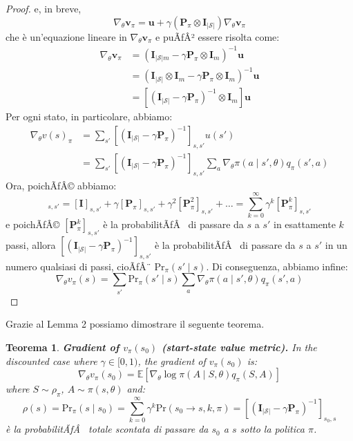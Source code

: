 ﻿\documentclass[11pt, a4paper]{report}
\newtheorem{theorem}{Teorema}
\begin{document}
\begin{proof}
e, in breve,
\begin{equation}
\nabla_{\theta} \bm{v}_{\pi} = \bm{u} + \gamma (\bm{P}_{\pi} \otimes \bm{I}_{|\mathcal{S}|}) \nabla_{\theta} \bm{v}_{\pi}
\end{equation}
che è un'equazione lineare in $\nabla_{\theta} \bm{v}_{\pi}$ e puÃƒÂ² essere risolta come:
\begin{align*}
\nabla_{\theta} \bm{v}_{\pi} &= (\bm{I}_{|\mathcal{S}|m} - \gamma \bm{P}_{\pi} \otimes \bm{I}_m)^{-1} \bm{u} \\
&= (\bm{I}_{|\mathcal{S}|} \otimes \bm{I}_m - \gamma \bm{P}_{\pi} \otimes \bm{I}_m)^{-1} \bm{u} \\
&= [(\bm{I}_{|\mathcal{S}|} - \gamma \bm{P}_{\pi})^{-1} \otimes \bm{I}_m] \bm{u}
\end{align*}
Per ogni stato, in particolare, abbiamo:
\begin{align*}
\nabla_{\theta} v(s)_{\pi} &= \sum_{s'} [(\bm{I}_{|\mathcal{S}|} - \gamma \bm{P}_{\pi})^{-1}]_{s, s'} u(s') \\
&= \sum_{s'} [(\bm{I}_{|\mathcal{S}|} - \gamma \bm{P}_{\pi})^{-1}]_{s, s'} \sum_a \nabla_{\theta} \pi(a \mid s', \theta) q_{\pi}(s', a)
\end{align*}
Ora, poichÃƒÂ© abbiamo:
\begin{equation}
[(\bm{I}_{|\mathcal{S}|} - \gamma \bm{P}_{\pi})^{-1}]_{s, s'} = [\bm{I}]_{s, s'} + \gamma [\bm{P}_{\pi}]_{s, s'} + \gamma^2 [\bm{P}_{\pi}^2]_{s, s'} + \dots = \sum_{k=0}^{\infty} \gamma^k [\bm{P}_{\pi}^k]_{s, s'}
\end{equation}
e poichÃƒÂ© $[\bm{P}_{\pi}^k]_{s, s'}$ è la probabilitÃƒÂ  di passare da $s$ a $s'$ in esattamente $k$ passi, allora $[(\bm{I}_{|\mathcal{S}|} - \gamma \bm{P}_{\pi})^{-1}]_{s, s'}$ è la probabilitÃƒÂ  di passare da $s$ a $s'$ in un numero qualsiasi di passi, cioÃƒÂ¨ $\text{Pr}_{\pi}(s' \mid s)$. Di conseguenza, abbiamo infine:
\begin{equation}
\nabla_{\theta} v_{\pi}(s) = \sum_{s'} \text{Pr}_{\pi}(s' \mid s) \sum_a \nabla_{\theta} \pi(a \mid s', \theta) q_{\pi}(s', a)
\end{equation}
\end{proof}

Grazie al Lemma 2 possiamo dimostrare il seguente teorema.

\begin{theorem}
\textbf{Gradient of $v_{\pi}(s_0)$ (start-state value metric).} In the discounted case where $\gamma \in [0, 1)$, the gradient of $v_{\pi}(s_0)$ is:
\begin{equation}
\nabla_{\theta} v_{\pi}(s_0) = \mathbb{E} [\nabla_{\theta} \log \pi(A \mid S, \theta) q_{\pi}(S, A)]
\end{equation}
where $S \sim \rho_{\pi}$, $A \sim \pi(s, \theta)$ and:
\begin{equation}
\rho(s) = \text{Pr}_{\pi}(s \mid s_0) = \sum_{k=0}^{\infty} \gamma^k \text{Pr}(s_0 \to s, k, \pi) = [(\bm{I}_{|\mathcal{S}|} - \gamma \bm{P}_{\pi})^{-1}]_{s_0, s}
\end{equation}
è la probabilitÃƒÂ  totale scontata di passare da $s_0$ a $s$ sotto la politica $\pi$.
\end{theorem}
\end{document}
